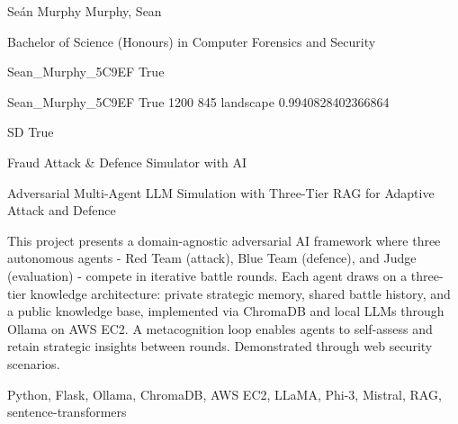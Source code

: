 
\begingroup{}\relax



\def\Key{Sean_Murphy_5C9EF}

{Seán Murphy}
{Murphy, Sean}

{Bachelor of Science (Honours) in Computer Forensics and Security}

{Sean_Murphy_5C9EF}
{True}

{Sean_Murphy_5C9EF}
{True}
{1200}
{845}
{landscape}
{0.9940828402366864}

{SD}
{True}

{Fraud Attack \& Defence Simulator with AI}

{Adversarial Multi-Agent LLM Simulation with Three-Tier RAG for Adaptive Attack and Defence}

{This project presents a domain-agnostic adversarial AI framework where three autonomous agents - Red Team (attack), Blue Team (defence), and Judge (evaluation) - compete in iterative battle rounds. Each agent draws on a three-tier knowledge architecture: private strategic memory, shared battle history, and a public knowledge base, implemented via ChromaDB and local LLMs through Ollama on AWS EC2. A metacognition loop enables agents to self-assess and retain strategic insights between rounds. Demonstrated through web security scenarios.}

{Python, Flask, Ollama, ChromaDB, AWS EC2, LLaMA, Phi-3, Mistral, RAG, sentence-transformers}

